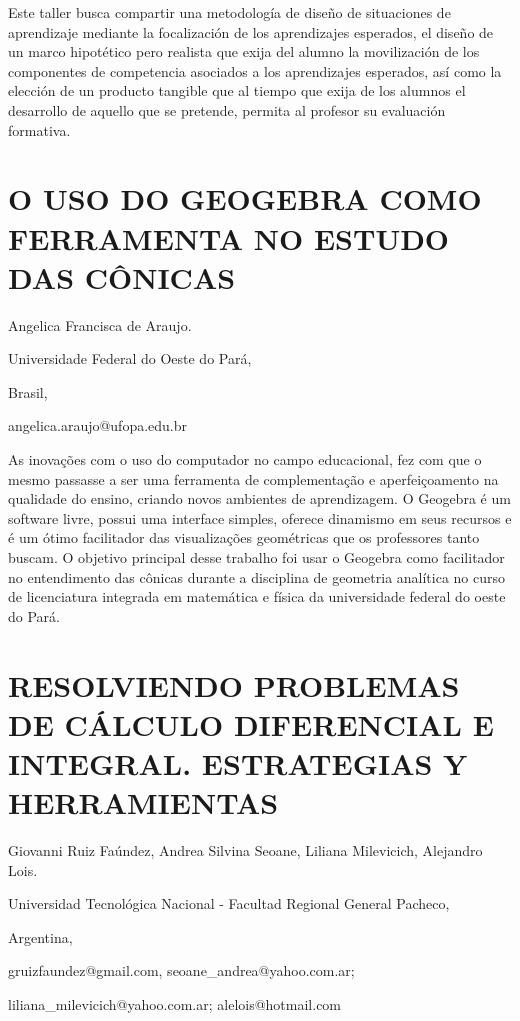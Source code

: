 Este taller busca compartir una metodología de diseño de situaciones
de aprendizaje mediante la focalización de los aprendizajes esperados,
el diseño de un marco hipotético pero realista que exija del alumno
la movilización de los componentes de competencia asociados a los
aprendizajes esperados, así como la elección de un producto tangible
que al tiempo que exija de los alumnos el desarrollo de aquello que
se pretende, permita al profesor su evaluación formativa. 


\section{O USO DO GEOGEBRA COMO FERRAMENTA NO ESTUDO DAS CÔNICAS}

\begin{datos}

Angelica Francisca de Araujo.

Universidade Federal do Oeste do Pará,

Brasil,

angelica.araujo@ufopa.edu.br

\end{datos}

As inovações com o uso do computador no campo educacional, fez com
que o mesmo passasse a ser uma ferramenta de complementação e aperfeiçoamento
na qualidade do ensino, criando novos ambientes de aprendizagem. O
Geogebra é um software livre, possui uma interface simples, oferece
dinamismo em seus recursos e é um ótimo facilitador das visualizações
geométricas que os professores tanto buscam. O objetivo principal
desse trabalho foi usar o Geogebra como facilitador no entendimento
das cônicas durante a disciplina de geometria analítica no curso de
licenciatura integrada em matemática e física da universidade federal
do oeste do Pará.


\section{RESOLVIENDO PROBLEMAS DE CÁLCULO DIFERENCIAL E INTEGRAL. ESTRATEGIAS
Y HERRAMIENTAS}

\begin{datos}

Giovanni Ruiz Faúndez, Andrea Silvina Seoane, Liliana Milevicich,
Alejandro Lois.

Universidad Tecnológica Nacional - Facultad Regional General Pacheco,

Argentina,

gruizfaundez@gmail.com, seoane\_andrea@yahoo.com.ar;

liliana\_milevicich@yahoo.com.ar; alelois@hotmail.com

\end{datos}

